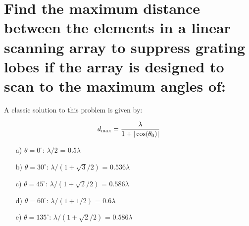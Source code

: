 \documentclass[12pt, letterpaper]{article}
\begin{document}
\section{Find the maximum distance between the elements in a linear scanning array to suppress grating lobes if the array is designed to scan to the maximum angles of:}

A classic solution to this problem is given by:

\begin{align*}
  d_{\max}={\lambda\over1+|\cos(\theta_0)|}
\end{align*}

\begin{itemize}
  \item [a)] $\theta = 0^{\circ}$: $\lambda/2$ = $0.5\lambda$
  \item [b)] $\theta = 30^{\circ}$: $\lambda/(1+\sqrt{3}/2)$ = $0.536\lambda$
  \item [c)] $\theta = 45^{\circ}$: $\lambda/(1+\sqrt{2}/2)$ = $0.586\lambda$
  \item [d)] $\theta = 60^{\circ}$: $\lambda/(1+1/2)$ = $0.\bar{6}\lambda$
  \item [e)] $\theta = 135^{\circ}$: $\lambda/(1+\sqrt{2}/2)$ = $0.586\lambda$
\end{itemize}
\end{document}
